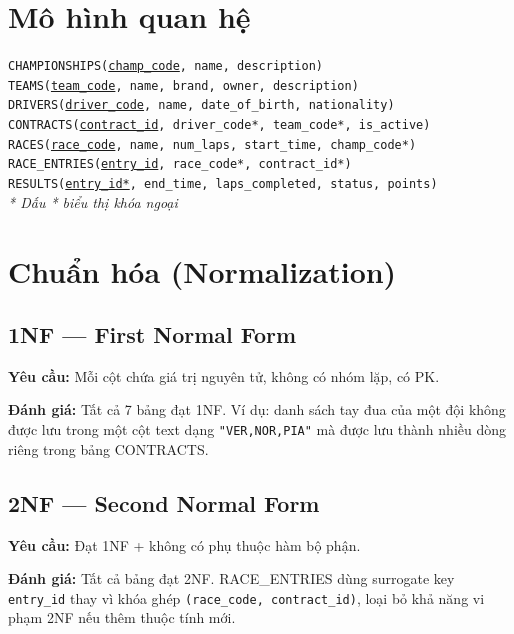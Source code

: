 \documentclass[13pt, a4paper]{report}
\begin{document}
\section{Mô hình quan hệ}

\begin{notebox}
\texttt{CHAMPIONSHIPS(\underline{champ\_code}, name, description)} \\
\texttt{TEAMS(\underline{team\_code}, name, brand, owner, description)} \\
\texttt{DRIVERS(\underline{driver\_code}, name, date\_of\_birth, nationality)} \\
\texttt{CONTRACTS(\underline{contract\_id}, driver\_code*, team\_code*, is\_active)} \\
\texttt{RACES(\underline{race\_code}, name, num\_laps, start\_time, champ\_code*)} \\
\texttt{RACE\_ENTRIES(\underline{entry\_id}, race\_code*, contract\_id*)} \\
\texttt{RESULTS(\underline{entry\_id*}, end\_time, laps\_completed, status, points)}
\vspace{4pt}\\
\small\textit{* Dấu * biểu thị khóa ngoại}
\end{notebox}

\section{Chuẩn hóa (Normalization)}

\subsection{1NF --- First Normal Form}
\textbf{Yêu cầu:} Mỗi cột chứa giá trị nguyên tử, không có nhóm lặp, có PK.

\textbf{Đánh giá:} Tất cả 7 bảng đạt 1NF. Ví dụ: danh sách tay đua của một đội không được lưu trong một cột text dạng \texttt{"VER,NOR,PIA"} mà được lưu thành nhiều dòng riêng trong bảng CONTRACTS.

\subsection{2NF --- Second Normal Form}
\textbf{Yêu cầu:} Đạt 1NF + không có phụ thuộc hàm bộ phận.

\textbf{Đánh giá:} Tất cả bảng đạt 2NF. RACE\_ENTRIES dùng surrogate key \texttt{entry\_id} thay vì khóa ghép \texttt{(race\_code, contract\_id)}, loại bỏ khả năng vi phạm 2NF nếu thêm thuộc tính mới.
\end{document}

